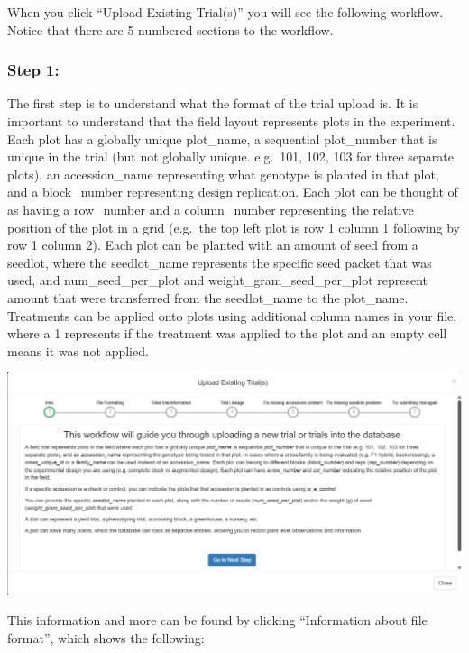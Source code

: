 \documentclass[
  12pt,
]{book}
\begin{document}
When you click ``Upload Existing Trial(s)'' you will see the following workflow. Notice that there are 5 numbered sections to the workflow.

\hypertarget{step-1}{%
\subsubsection*{Step 1:}\label{step-1}}


The first step is to understand what the format of the trial upload is. It is important to understand that the field layout represents plots in the experiment. Each plot has a globally unique plot\_name, a sequential plot\_number that is unique in the trial (but not globally unique. e.g.~101, 102, 103 for three separate plots), an accession\_name representing what genotype is planted in that plot, and a block\_number representing design replication. Each plot can be thought of as having a row\_number and a column\_number representing the relative position of the plot in a grid (e.g.~the top left plot is row 1 column 1 following by row 1 column 2). Each plot can be planted with an amount of seed from a seedlot, where the seedlot\_name represents the specific seed packet that was used, and num\_seed\_per\_plot and weight\_gram\_seed\_per\_plot represent amount that were transferred from the seedlot\_name to the plot\_name. Treatments can be applied onto plots using additional column names in your file, where a 1 represents if the treatment was applied to the plot and an empty cell means it was not applied.

\begin{center}\includegraphics[width=0.95\linewidth]{assets/images/manage_trials_upload_trial_1} \end{center}

This information and more can be found by clicking ``Information about file format'', which shows the following:
\end{document}
